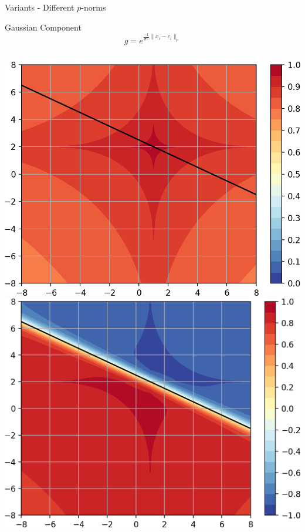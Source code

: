 \documentclass{beamer}
\begin{document}
\begin{frame}{Variants - Different $p$-norms}
    \begin{block}{Gaussian Component}
        $$ g = e^{\frac{-1}{\sigma^2}\lVert x_i-c_i \lVert_p }$$
    \end{block}
    \vspace{0.3cm}
    \begin{columns}
    \hspace{-0.2cm}
    \begin{column}{.27\textwidth}
            \includegraphics[width=\textwidth]{images/Variants-Norms/ord0.5_g-cropped.png}\\
            \includegraphics[width=\textwidth]{images/Variants-Norms/ord0.5-cropped.png}\\

\end{column}
\end{columns}
\end{frame}
\end{document}
